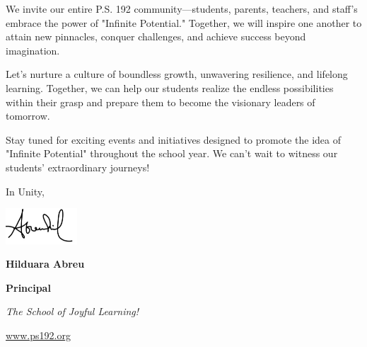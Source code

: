 \documentclass[12pt,letterpaper]{article}
\begin{document}
We invite our entire P.S. 192 community—students, parents, teachers, and staff's embrace the power of "Infinite Potential." Together, we will inspire one another to attain new pinnacles, conquer challenges, and achieve success beyond imagination.

Let's nurture a culture of boundless growth, unwavering resilience, and lifelong learning. Together, we can help our students realize the endless possibilities within their grasp and prepare them to become the visionary leaders of tomorrow.

Stay tuned for exciting events and initiatives designed to promote the idea of "Infinite Potential" throughout the school year. We can't wait to witness our students' extraordinary journeys!

In Unity,

\includegraphics[width=0.2\textwidth]{hil_signature}

\textbf{Hilduara Abreu}

\textbf{Principal}

\textit{The School of Joyful Learning!}

\url{www.ps192.org}
\end{document}

